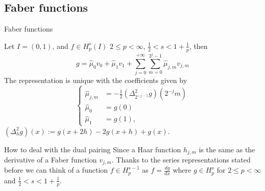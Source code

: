 \documentclass{beamer}
\begin{document}
\subsection{Faber functions}
\begin{frame}{Faber functions}
        \begin{theorem}
                {\footnotesize
                Let
                $ I = (0,1) $,
                and
                $f \in H^{s}_{p}(I)$
                $ 2 \le p < \infty $,
                $ \frac{1}{2} < s < 1+\frac{1}{p} $,
                then
                \begin{equation*}
                        g = \hat{\mu}_0 v_0 + \hat{\mu}_1 v_1 + \sum_{j=0}^{+\infty} \sum_{m=0}^{2^{j} - 1} \hat{\mu}_{j,m} v_{j,m}
                \end{equation*}
                The representation is unique with the coefficients given by
                \begin{equation*}
                        \begin{cases}
                                \hat{\mu}_{j,m} &= -\frac{1}{2} (\Delta^{2}_{2^{-j-1}} g)(2^{-j} m)
                                \\
                                \hat{\mu}_0 &= g(0)
                                \\
                                \hat{\mu}_1 &= g(1),
                        \end{cases}
                \end{equation*}
                $(\Delta^{2}_{h} g) (x) := g(x + 2h) - 2g(x + h) + g(x)$.
                }
        \end{theorem}

\end{frame}

\begin{frame}{How to deal with the dual pairing}
        Since a Haar function
        $ h_{j,m} $
        is the same as the derivative of a Faber function
        $ v_{j,m} $.
        Thanks to the series representations stated before we can think of a function
        $ f \in H^{s-1}_{p} $
        as
        $ f = \frac{dg}{dx} $
        where
       $ g \in H^{s}_{p} $
        for
        $ 2 \le p < \infty $
        and
        $ \frac{1}{2} < s < 1 + \frac{1}{p} $.
\end{frame}
\end{document}
